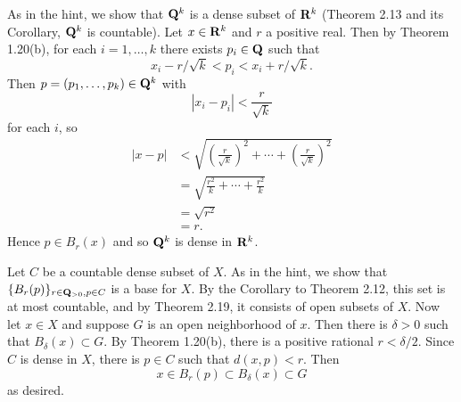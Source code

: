 \begin{ex}
As in the hint, we show that $\mathbf{Q}^k$ is a dense subset of $\mathbf{R}^k$ (Theorem 2.13 and its Corollary, $\mathbf{Q}^k$ is countable). Let $x \in \mathbf{R}^k$ and $r$ a positive real. Then by Theorem 1.20(b), for each $i = 1, \ldots, k$ there exists $p_i \in \mathbf{Q}$ such that \[x_i - r/\sqrt{k} < p_i < x_i + r/\sqrt{k}.\] Then $p = (p_1, \ldots, p_k) \in \mathbf{Q}^k$ with \[|x_i-p_i| < \frac{r}{\sqrt{k}}\] for each $i$, so
\begin{align*}
|x-p| & < \sqrt{\left(\frac{r}{\sqrt{k}}\right)^2 + \cdots + \left(\frac{r}{\sqrt{k}}\right)^2}\\
& = \sqrt{\frac{r^2}{k} + \cdots + \frac{r^2}{k}}\\
& = \sqrt{r^2}\\
& = r.
\end{align*}
Hence $p \in B_r(x)$ and so $\mathbf{Q}^k$ is dense in $\mathbf{R}^k$.
\end{ex}

\begin{ex}
Let $C$ be a countable dense subset of $X$. As in the hint, we show that $\{B_r(p)\}_{r \in \mathbf{Q}_{> 0}, p \in C}$ is a base for $X$. By the Corollary to Theorem 2.12, this set is at most countable, and by Theorem 2.19, it consists of open subsets of $X$. Now let $x \in X$ and suppose $G$ is an open neighborhood of $x$. Then there is $\delta > 0$ such that $B_{\delta}(x) \subset G$. By Theorem 1.20(b), there is a positive rational $r < \delta/2$. Since $C$ is dense in $X$, there is $p \in C$ such that $d(x, p) < r$. Then \[x \in B_r(p) \subset B_{\delta}(x) \subset G\] as desired.
\end{ex}

